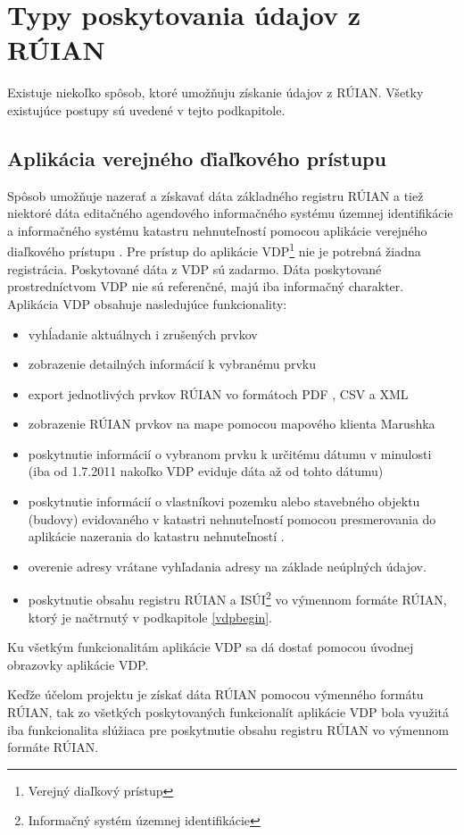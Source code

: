 \section{Typy poskytovania údajov z RÚIAN}
Existuje niekoľko spôsob, ktoré umožňuju získanie údajov z RÚIAN. Všetky existujúce postupy sú uvedené v tejto podkapitole.
\subsection{Aplikácia verejného ďiaľkového prístupu}
Spôsob umožňuje nazerať a získavať dáta základného registru RÚIAN a tiež niektoré dáta editačného agendového informačného systému územnej identifikácie \cite{Isui} a informačného systému katastru nehnuteľností \cite{Iksn} pomocou aplikácie verejného diaľkového prístupu \cite{Vdpman}.
Pre prístup do aplikácie VDP\footnote{Verejný diaľkový prístup} nie je potrebná žiadna registrácia. Poskytované dáta z VDP sú zadarmo. Dáta poskytované prostredníctvom VDP nie sú referenčné, majú iba informačný charakter. Aplikácia VDP obsahuje nasledujúce funkcionality:
\begin{itemize}
\item vyhĺadanie aktuálnych i zrušených prvkov
\item zobrazenie detailných informácií k vybranému prvku
\item export jednotlivých prvkov RÚIAN vo formátoch PDF \cite{Pdf}, CSV \cite{Csv} a XML \cite{Xml}
\item zobrazenie RÚIAN prvkov na mape pomocou mapového klienta Marushka \cite{Marushka}
\item poskytnutie informácií o vybranom prvku k určitému dátumu v minulosti (iba od 1.7.2011 nakoľko VDP eviduje dáta až od tohto dátumu)
\item poskytnutie informácií o vlastníkovi pozemku alebo stavebného objektu (budovy) evidovaného v
katastri nehnuteľností pomocou presmerovania do aplikácie nazerania do katastru nehnuteľností \cite{Kn}.
\item overenie adresy vrátane vyhľadania adresy na základe neúplných údajov.
\item poskytnutie obsahu registru RÚIAN a ISÚI\footnote{Informačný systém územnej identifikácie} vo výmennom formáte RÚIAN, ktorý je načtrnutý v podkapitole \ref{vdpbegin}.
\end{itemize}
Ku všetkým funkcionalitám aplikácie VDP sa dá dostať pomocou úvodnej obrazovky aplikácie VDP\cite{Vdp}.

Keďže účelom projektu je získať dáta RÚIAN pomocou výmenného formátu RÚIAN, tak zo všetkých poskytovaných funkcionalít aplikácie VDP bola využitá iba funkcionalita slúžiaca pre poskytnutie obsahu registru RÚIAN vo výmennom formáte RÚIAN.
